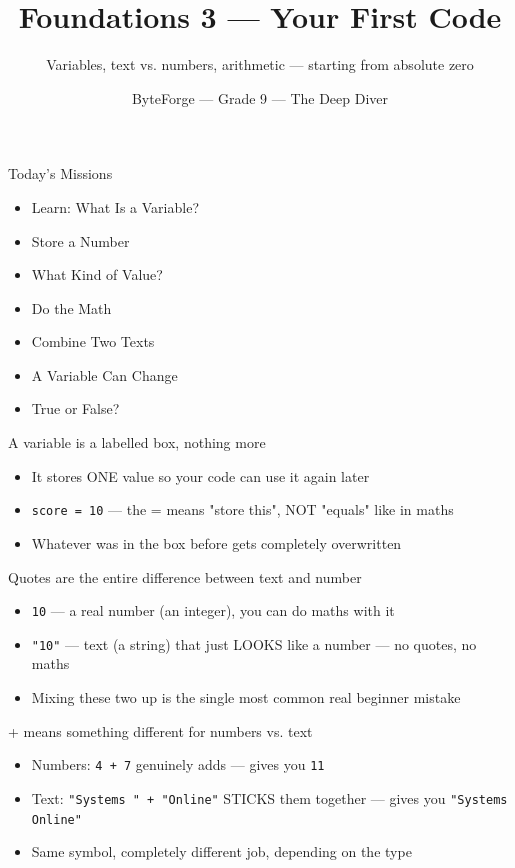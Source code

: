 \documentclass[aspectratio=169]{beamer}
\title{Foundations 3 — Your First Code}
\subtitle{Variables, text vs. numbers, arithmetic --- starting from absolute zero}
\author{ByteForge --- Grade 9 --- The Deep Diver}
\date{}
\begin{document}
\begin{frame}
    \titlepage
\end{frame}

\begin{frame}{Today's Missions}
    \Large
    \begin{itemize}
        \item Learn: What Is a Variable?
        \item Store a Number
        \item What Kind of Value?
        \item Do the Math
        \item Combine Two Texts
        \item A Variable Can Change
        \item True or False?
    \end{itemize}
\end{frame}

\begin{frame}{A variable is a labelled box, nothing more}
    \large
    \begin{itemize}
        \item It stores ONE value so your code can use it again later
        \item \texttt{score = 10} --- the = means "store this", NOT "equals" like in maths
        \item Whatever was in the box before gets completely overwritten
    \end{itemize}
\end{frame}


\begin{frame}{Quotes are the entire difference between text and number}
    \large
    \begin{itemize}
        \item \texttt{10} --- a real number (an integer), you can do maths with it
        \item \texttt{"10"} --- text (a string) that just LOOKS like a number --- no quotes, no maths
        \item Mixing these two up is the single most common real beginner mistake
    \end{itemize}
\end{frame}


\begin{frame}{+ means something different for numbers vs. text}
    \large
    \begin{itemize}
        \item Numbers: \texttt{4 + 7} genuinely adds --- gives you \texttt{11}
        \item Text: \texttt{"Systems " + "Online"} STICKS them together --- gives you \texttt{"Systems Online"}
        \item Same symbol, completely different job, depending on the type
    \end{itemize}
\end{frame}
\end{document}

